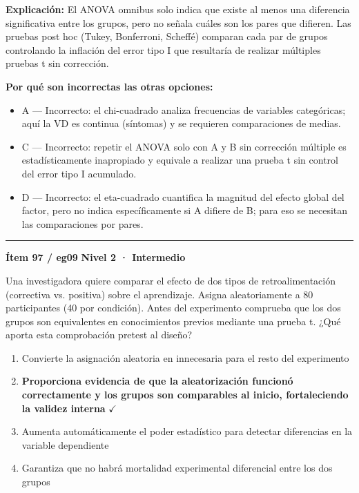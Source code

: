 \documentclass[12pt,a4paper]{article}
\begin{document}
\noindent\textbf{\color{azul}Explicación:} El ANOVA omnibus solo indica que existe al menos una diferencia significativa entre los grupos, pero no señala cuáles son los pares que difieren. Las pruebas post hoc (Tukey, Bonferroni, Scheffé) comparan cada par de grupos controlando la inflación del error tipo I que resultaría de realizar múltiples pruebas t sin corrección.

\noindent\textbf{\color{gris}Por qué son incorrectas las otras opciones:}
\begin{itemize}
  \item {\small A — Incorrecto: el chi-cuadrado analiza frecuencias de variables categóricas; aquí la VD es continua (síntomas) y se requieren comparaciones de medias.}
  \item {\small C — Incorrecto: repetir el ANOVA solo con A y B sin corrección múltiple es estadísticamente inapropiado y equivale a realizar una prueba t sin control del error tipo I acumulado.}
  \item {\small D — Incorrecto: el eta-cuadrado cuantifica la magnitud del efecto global del factor, pero no indica específicamente si A difiere de B; para eso se necesitan las comparaciones por pares.}
\end{itemize}
\vspace{8pt}\hrule\vspace{10pt}

\begin{mdframed}[backgroundcolor=fondogris,linecolor=ambar,linewidth=1pt,innerleftmargin=10pt,innerrightmargin=10pt,innertopmargin=7pt,innerbottommargin=7pt]
\textbf{Ítem 97 / eg09} \hfill {\small\bfseries\color{ambar} Nivel 2 · Intermedio}
\end{mdframed}

Una investigadora quiere comparar el efecto de dos tipos de retroalimentación (correctiva vs. positiva) sobre el aprendizaje. Asigna aleatoriamente a 80 participantes (40 por condición). Antes del experimento comprueba que los dos grupos son equivalentes en conocimientos previos mediante una prueba t. ¿Qué aporta esta comprobación pretest al diseño?

\begin{enumerate}
  \item[A.] Convierte la asignación aleatoria en innecesaria para el resto del experimento
  \item[\textbf{\color{verde}B.}] \textbf{\color{verde} Proporciona evidencia de que la aleatorización funcionó correctamente y los grupos son comparables al inicio, fortaleciendo la validez interna} \hfill $\checkmark$
  \item[C.] Aumenta automáticamente el poder estadístico para detectar diferencias en la variable dependiente
  \item[D.] Garantiza que no habrá mortalidad experimental diferencial entre los dos grupos
\end{enumerate}
\end{document}
